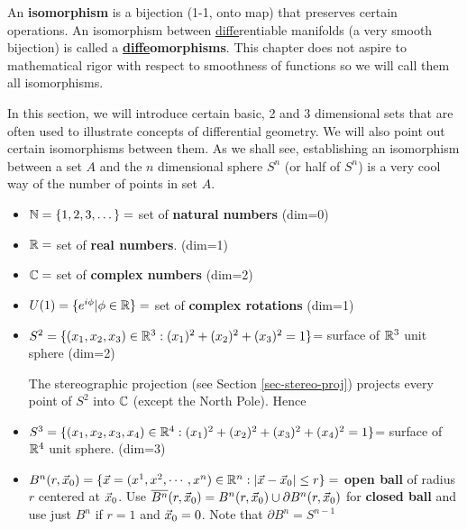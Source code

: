 An {\bf isomorphism} is a bijection (1-1, onto map) that preserves certain 
operations.
An isomorphism 
between \ul{diffe}rentiable  manifolds
(a very smooth bijection) 
is called a {\bf \ul{diffe}omorphisms}.
This chapter does not
aspire to mathematical rigor
with respect to smoothness of functions so we 
will call them 
all isomorphisms.

In this section, we will
introduce certain basic, 2 and 3 dimensional sets
that are often used to illustrate
concepts of differential geometry.
We will also point out
certain isomorphisms 
between them.
As we shall see,  establishing an isomorphism between a set $A$ and 
 the $n$ dimensional sphere $S^n$ (or half of $S^n$) is  a very cool way 
of  the number of points in
set $A$.

 

\begin{itemize}

\item ${\mathbb{N}}= \{1, 2, 3, \dots\}=$ set of {\bf natural numbers} (dim=0)

\item ${ \mathbb{R}}=$ set of {\bf real numbers}. (dim=1)

\item ${ \mathbb{C}}=$ set of {\bf complex numbers} (dim=2)

\item $U(1)= \{e^{i\phi}|\phi \in { \mathbb{R}}\}=$
set of {\bf complex rotations} (dim=1)

\item $S^2=\{ (x_1, x_2, x_3)\in{ \mathbb{R}}^3 : (x_1)^2 + (x_2)^2 + (x_3)^2=1\}$= surface of ${ \mathbb{R}}^3$ unit sphere (dim=2)

The stereographic projection
(see Section \ref{sec-stereo-proj})
projects every point of $S^2$ into ${ \mathbb{C}}$ (except the North Pole). Hence

\beq
{}
\eeq

\item $S^3=\{ (x_1, x_2, x_3, x_4)\in { \mathbb{R}}^4 : (x_1)^2 + (x_2)^2 + (x_3)^2 + (x_4)^2=1\}$=  surface of ${ \mathbb{R}}^4$ unit sphere.  (dim=3)

\item $B^n(r, {\vec{x}}_0)=\{{\vec{x}}=(x^1, x^2, \cdots, x^n)\in { \mathbb{R}}^n : |{\vec{x}}-{\vec{x}}_0|\leq r \}=$ {\bf open ball} of radius $r$ centered at ${\vec{x}}_0$. Use 
$\overline{B^n}(r, {\vec{x}}_0)=B^n(r, {\vec{x}}_0) \cup \partial B^n(r, {\vec{x}}_0)$ for {\bf closed ball} and use just $B^n$ if $r=1$ and ${\vec{x}}_0=0$. Note that 
$\partial B^n = S^{n-1}$



\end{itemize}
